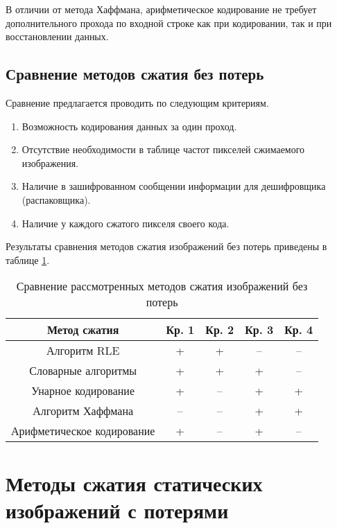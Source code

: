 В отличии от метода Хаффмана, арифметическое кодирование не требует дополнительного прохода по входной строке как при кодировании, так и при восстановлении данных.


\subsection{Сравнение методов сжатия без потерь}

Сравнение предлагается проводить по следующим критериям.
\begin{enumerate}
    \item Возможность кодирования данных за один проход.
    \item Отсутствие необходимости в таблице частот пикселей сжимаемого изображения.
    \item Наличие в зашифрованном сообщении информации для дешифровщика (распаковщика).
    \item Наличие у каждого сжатого пикселя своего кода.
\end{enumerate}

Результаты сравнения методов сжатия изображений без потерь приведены в таблице \ref{tbl:compare_realizations1}.
\captionsetup{justification=raggedleft,singlelinecheck=false}
\begin{table}[H]
    \centering
	\caption{Сравнение рассмотренных методов сжатия изображений без потерь}
    \label{tbl:compare_realizations1}
	\begin{tabular}{|c|c|c|c|c|}
        \hline
        \textbf{Метод сжатия} & \textbf{Кр. 1} & \textbf{Кр. 2} & \textbf{Кр. 3} & \textbf{Кр. 4}
        \\ \hline
        Алгоритм RLE               & +  & +  & -- & -- \\ \hline
        Словарные алгоритмы        & +  & +  & +  & -- \\ \hline
        Унарное кодирование        & +  & -- & +  & +  \\ \hline
        Алгоритм Хаффмана          & -- & -- & +  & +  \\ \hline
        Арифметическое кодирование & +  & -- & +  & -- \\ \hline
    \end{tabular}
\end{table}

\section{Методы сжатия статических изображений с \mbox{потерями}}

